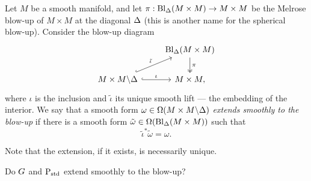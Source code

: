 \documentclass[\MainFolder/Text.tex]{subfiles}
\begin{document}
\begin{Definition}\label{Def:Esdas}
Let $M$ be a smooth manifold, and let $\pi: \mathrm{Bl}_\Delta(M\times M)\rightarrow M\times M$ be the Melrose blow-up of $M\times M$ at the diagonal $\Delta$ (this is another name for the spherical blow-up). Consider the blow-up diagram
$$\begin{tikzcd}
 & \Bl_\Diag(M\times M)\arrow[two heads]{d}{\pi} \\
 M\times M\backslash \Diag \arrow[hook]{r}{\iota}\arrow[hook]{ru}{\tilde{\iota}} & M\times M,
\end{tikzcd}$$
where $\iota$ is the inclusion and $\tilde{\iota}$ its unique smooth lift --- the embedding of the interior. We say that a smooth form $\omega\in\Omega(M\times M\backslash\Delta)$ \emph{extends smoothly to the blow-up} if there is a smooth form $\tilde{\omega}\in \Omega(\mathrm{Bl}_\Delta(M\times M))$ such that 
$$ \tilde{\iota}^*\tilde{\omega}=\omega. $$
\end{Definition}

Note that the extension, if it exists, is necessarily unique.

\begin{Question}
Do $G$ and $\mathrm{P}_{\mathrm{std}}$ extend smoothly to the blow-up?
\end{Question}
\end{document}
